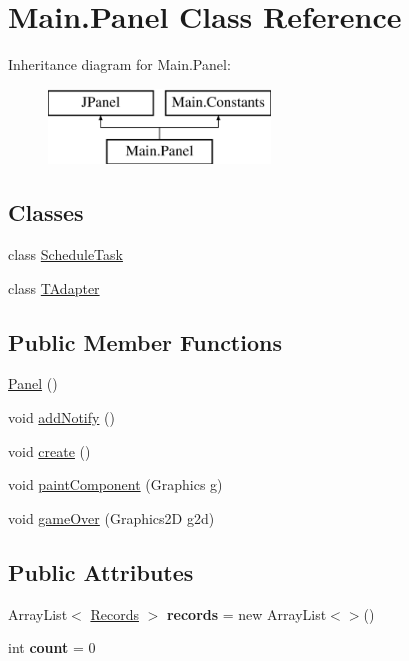\hypertarget{class_main_1_1_panel}{}\section{Main.\+Panel Class Reference}
\label{class_main_1_1_panel}
Inheritance diagram for Main.\+Panel\+:\begin{figure}[H]
\begin{center}
\leavevmode
\includegraphics[height=2.000000cm]{class_main_1_1_panel}
\end{center}
\end{figure}
\subsection*{Classes}
\begin{DoxyCompactItemize}
\item 
class \hyperlink{class_main_1_1_panel_1_1_schedule_task}{Schedule\+Task}
\item 
class \hyperlink{class_main_1_1_panel_1_1_t_adapter}{T\+Adapter}
\end{DoxyCompactItemize}
\subsection*{Public Member Functions}
\begin{DoxyCompactItemize}
\item 
\hyperlink{class_main_1_1_panel_a1e24432e564f9ce3ba9256b62b747f49}{Panel} ()
\item 
void \hyperlink{class_main_1_1_panel_a43135c9d6be14c228f7c530613f9fd87}{add\+Notify} ()
\item 
void \hyperlink{class_main_1_1_panel_a99b5a8bb204915a0fe15c62762434838}{create} ()
\item 
void \hyperlink{class_main_1_1_panel_a6903271f2f5062667ff01b3d1d748cb7}{paint\+Component} (Graphics g)
\item 
void \hyperlink{class_main_1_1_panel_a4abb223924af2b3ff64bae87a74644bf}{game\+Over} (Graphics2D g2d)
\end{DoxyCompactItemize}
\subsection*{Public Attributes}
\begin{DoxyCompactItemize}
\item 
Array\+List$<$ \hyperlink{class_main_1_1_records}{Records} $>$ {\bfseries records} = new Array\+List$<$$>$()\hypertarget{class_main_1_1_panel_a1316464998129458ce372c8148dca5c6}{}\label{class_main_1_1_panel_a1316464998129458ce372c8148dca5c6}

\item 
int {\bfseries count} = 0\hypertarget{class_main_1_1_panel_a0e04764160c5a402424d3ab67aa32bc9}{}\label{class_main_1_1_panel_a0e04764160c5a402424d3ab67aa32bc9}

\end{DoxyCompactItemize}

